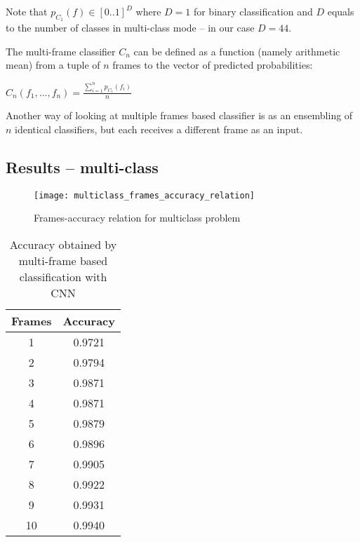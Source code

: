     Note that $p_{C_{1}}(f) \in [0..1]^D$ where $D = 1$ for binary classification
    and $D$ equals to the number of classes in multi-class mode -- in our case $D = 44$.


    The multi-frame classifier $C_{n}$ can be defined as a function (namely arithmetic mean)
    from a tuple of $n$ frames to the vector of predicted probabilities:

    \begin{center}
    $C_{n}(f_1, ..., f_n) = \frac{\sum\limits_{i=1}^{n}{p_{C_{1}}(f_{i})}}{n}$
    \end{center}

    Another way of looking at multiple frames based classifier is as an ensembling
    of $n$ identical classifiers, but each receives a different frame as an input.
    \newpage

    \subsection{Results -- multi-class}

    \begin{figure}[H]
        \caption{Frames-accuracy relation for multiclass problem}
        \centering
        \texttt{[image: multiclass\_frames\_accuracy\_relation]}
    \end{figure}

    \begin{table}[H]
      \begin{center}
      \small
      \caption{Accuracy obtained by multi-frame based classification with CNN}
      \begin{tabular}{ |c|c| }
      \hline
      Frames & Accuracy\\
      \hline
      1 & 0.9721\\
      \hline
      2 & 0.9794\\
      \hline
      3 & 0.9871\\
      \hline
      4 & 0.9871\\
      \hline
      5 & 0.9879\\
      \hline
      6 & 0.9896\\
      \hline
      7 & 0.9905\\
      \hline
      8 & 0.9922\\
      \hline
      9 & 0.9931\\
      \hline
      10 & 0.9940\\
      \hline
      \end{tabular}
      \end{center}
    \end{table}
    \newpage

